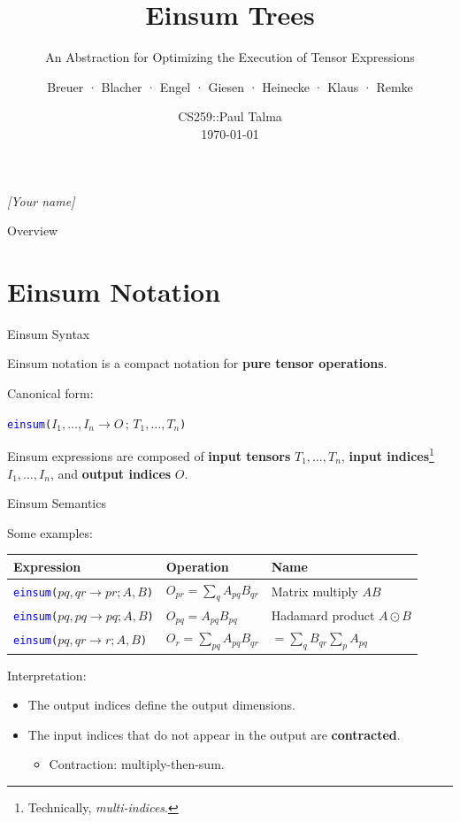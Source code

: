 \documentclass[aspectratio=169,10pt]{beamer}
\title{Einsum Trees}
\subtitle{An Abstraction for Optimizing the Execution of Tensor Expressions}
\author{Breuer · Blacher · Engel · Giesen · Heinecke · Klaus · Remke\\}
\date{CS259::Paul Talma\\\today}
\newcommand{\ein}[1]{\texttt{\textcolor{blue}{einsum}(#1)}}
\begin{document}
\begin{frame}
\maketitle
\textit{[Your name] }
\end{frame}

\begin{frame}{Overview}
\tableofcontents
\end{frame}

\section{Einsum Notation}

\begin{frame}{Einsum Syntax}

Einsum notation is a compact notation for \textbf{pure tensor operations}.

Canonical form:

\hspace{7em} \ein{$I_1, \ldots, I_n \to O\,;\, T_1, \ldots, T_n$}


Einsum expressions are composed of \textbf{input tensors} $T_1, \dots, T_n$, \textbf{input indices}\footnote{Technically, \emph{multi-indices}.} $I_1, \dots, I_n$, and \textbf{output indices} $O$.
\end{frame}

\begin{frame}{Einsum Semantics}

Some examples:

	\begin{center}
		\begin{tabular}{@{}l@{\quad}l@{}@{\quad}l@{}}
			\toprule
			\textbf{Expression} & \textbf{Operation} & \textbf{Name} \\
			\midrule
			\ein{$pq, qr \to pr; A, B$} & $O_{pr} = \sum_{q} A_{pq}B_{qr}$ & Matrix multiply $AB$ \\
			\ein{$pq, pq \to pq; A, B$} & $O_{pq} = A_{pq}B_{pq}$ & Hadamard product $A \odot B$ \\
			\ein{$pq, qr \to r; A, B$} & $O_{r} = \sum_{pq}A_{pq}B_{qr}$ & $= \sum_q B_{qr} \sum_p A_{pq}$\\
			\bottomrule
		\end{tabular}
	\end{center}

Interpretation:
\begin{itemize}
	\item The output indices define the output dimensions.
	\item The input indices that do not appear in the output are \textbf{contracted}.
	\begin{itemize}
		\item Contraction: multiply-then-sum.
	\end{itemize}
\end{itemize}
\end{frame}
\end{document}
